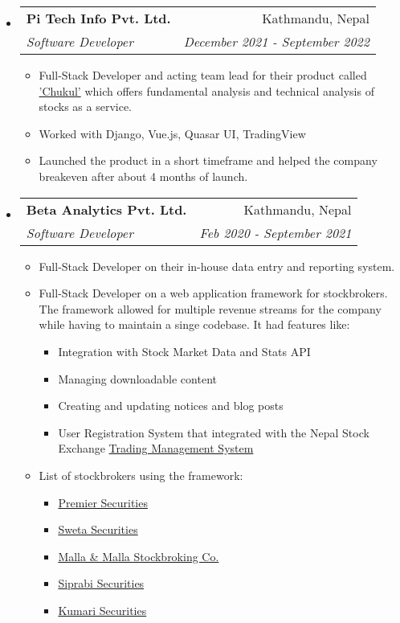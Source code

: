 \documentclass[letterpaper,11pt]{article}
\makeatletter
\newcommand{\cvsubheading}[4]{
\begin{tabular*}{6.5in}{l@{\cftdotfill{\cftsecdotsep}\extracolsep{\fill}}r}
        \textbf{#1} & #2 \\
        \textit{#3} & \textit{#4} \\
\end{tabular*}\vspace{-6pt}}
\newcommand{\cvitem}[1]{\item #1 \vspace{-2pt}}
\makeatother
\begin{document}
\begin{itemize}

      \item
            \cvsubheading{Pi Tech Info Pvt. Ltd.}{Kathmandu, Nepal}{Software Developer}{December 2021 - September 2022}
            \begin{itemize}
                  \cvitem{Full-Stack Developer and acting team lead for their product called \href{https://chukul.com}{'Chukul'} which offers fundamental analysis and technical analysis of stocks as a service.}
                  \cvitem{Worked with Django, Vue.js, Quasar UI, TradingView}
                  \cvitem{Launched the product in a short timeframe and helped the company breakeven after about 4 months of launch.}
            \end{itemize}

      \item
            \cvsubheading{Beta Analytics Pvt. Ltd.}{Kathmandu, Nepal}{Software Developer}{Feb 2020 - September 2021}
            \begin{itemize}
                  \cvitem{Full-Stack Developer on their in-house data entry and reporting system.}
                  \cvitem{
                        Full-Stack Developer on a web application framework for stockbrokers. The framework allowed for multiple revenue streams for the company while having to maintain a singe codebase. It had features like:
                        \begin{itemize}
                              \item Integration with Stock Market Data and Stats API
                              \item Managing downloadable content
                              \item Creating and updating notices and blog posts
                              \item User Registration System that integrated with the Nepal Stock Exchange \href{https://tms01.nepsetms.com.np/}{Trading Management System}
                        \end{itemize}
                  }
                  \cvitem{
                        List of stockbrokers using the framework:
                        \begin{itemize}
                              \item \href{https://www.premiersecurities.com.np/}{Premier Securities}
                              \item \href{https://www.swetasecurities.com/}{Sweta Securities}
                              \item \href{https://mallastock.com/}{Malla \& Malla Stockbroking Co.}
                              \item \href{https://siprabi.com/}{Siprabi Securities}
                              \item \href{https://kumarisecurities.com/}{Kumari Securities}
                        \end{itemize}
                  }


\end{itemize}
\end{itemize}
\end{document}
